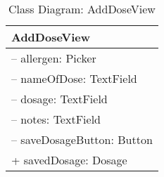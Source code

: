 \begin{table}[H]
\centering
\caption{Class Diagram: AddDoseView}

\hspace{1em}
\renewcommand{\arraystretch}{1.7}

\begin{tabular}{|l|}
\hline
\textbf{AddDoseView} \\
\hline
– allergen: Picker \\
– nameOfDose: TextField \\
– dosage: TextField \\
– notes: TextField \\
– saveDosageButton: Button \\
+ savedDosage: Dosage \\
\hline
\end{tabular}
\end{table}
